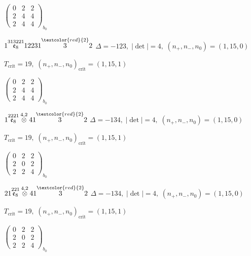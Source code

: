 \documentclass[10pt]{article}
\begin{document}
\hspace{2em}$\left(\begin{smallmatrix}0 & 2 & 2 \\ 2 & 4 & 4 \\ 2 & 4 & 4\end{smallmatrix}\right)_{\!b_0}$

\smallskip

$1\overset{313221}{\mathfrak{e}_8}12231\overset{\textcolor{red}{2}}{3}2$ \quad $\Delta=-123,\; |\det|=4,\; (n_+,n_-,n_0)=(1,15,0)$

\hspace{1em}$T_{\text{crit}}=19,\; (n_+,n_-,n_0)_{\text{crit}}=(1,15,1)$

\hspace{2em}$\left(\begin{smallmatrix}0 & 2 & 2 \\ 2 & 4 & 4 \\ 2 & 4 & 4\end{smallmatrix}\right)_{\!b_0}$

\smallskip

$1\overset{2221}{\mathfrak{e}_8}\overset{4,2}{\otimes}41\overset{\textcolor{red}{2}}{3}2$ \quad $\Delta=-134,\; |\det|=4,\; (n_+,n_-,n_0)=(1,15,0)$

\hspace{1em}$T_{\text{crit}}=19,\; (n_+,n_-,n_0)_{\text{crit}}=(1,15,1)$

\hspace{2em}$\left(\begin{smallmatrix}0 & 2 & 2 \\ 2 & 0 & 2 \\ 2 & 2 & 4\end{smallmatrix}\right)_{\!b_0}$

\smallskip

$21\overset{221}{\mathfrak{e}_8}\overset{4,2}{\otimes}41\overset{\textcolor{red}{2}}{3}2$ \quad $\Delta=-134,\; |\det|=4,\; (n_+,n_-,n_0)=(1,15,0)$

\hspace{1em}$T_{\text{crit}}=19,\; (n_+,n_-,n_0)_{\text{crit}}=(1,15,1)$

\hspace{2em}$\left(\begin{smallmatrix}0 & 2 & 2 \\ 2 & 0 & 2 \\ 2 & 2 & 4\end{smallmatrix}\right)_{\!b_0}$
\end{document}
